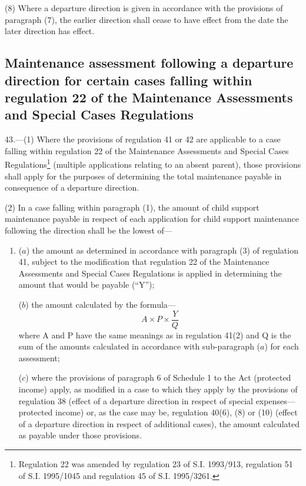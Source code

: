 \documentclass[12pt,a4paper]{article}
\begin{document}
(8) Where a departure direction is given in accordance with the provisions of paragraph (7), the earlier direction shall cease to have effect from the date the later direction has effect.


\subsection[43. Maintenance assessment following a departure direction for certain cases falling
within regulation 22 of the Maintenance Assessments and Special Cases
Regulations]{Maintenance assessment following a departure direction for certain cases falling
within regulation 22 of the Maintenance Assessments and Special Cases
Regulations}

43.—(1) Where the provisions of regulation 41 or 42 are applicable to
a case falling within regulation 22 of the Maintenance Assessments and Special
Cases Regulations\footnote{\frenchspacing Regulation 22 was amended by regulation 23 of S.I. 1993/913, regulation 51 of S.I. 1995/1045 and regulation 45 of S.I. 1995/3261.} (multiple applications relating to an absent parent),
those provisions shall apply for the purposes of determining the total
maintenance payable in consequence of a departure direction.

(2) In a case falling within paragraph (1), the amount of child support maintenance payable in respect of each application for child support maintenance following the direction shall be the 
lowest  %
of—
\begin{enumerate}\item[]
($a$) the amount as determined in accordance with paragraph (3) of regulation 41,
subject to the modification that regulation 22 of the Maintenance Assessments
and Special Cases Regulations is applied in determining the amount that would be
payable (“Y”);

($b$) the amount calculated by the formula—
\[A \times P \times \frac{Y}{Q}\]
where A and P have the same meanings as in regulation 41(2) and Q is the sum of
the amounts calculated in accordance with sub-paragraph ($a$) for each assessment;

($c$) where the provisions of paragraph 6 of Schedule 1 to the Act (protected income) apply, as modified in a case to which they apply by the provisions of regulation 38 (effect of a departure direction in respect of special expenses—protected income) or, as the case may be, regulation 40(6), (8) or (10) (effect of a departure direction in respect of additional cases), the amount calculated as payable under those provisions.
\end{enumerate}
\end{document}

